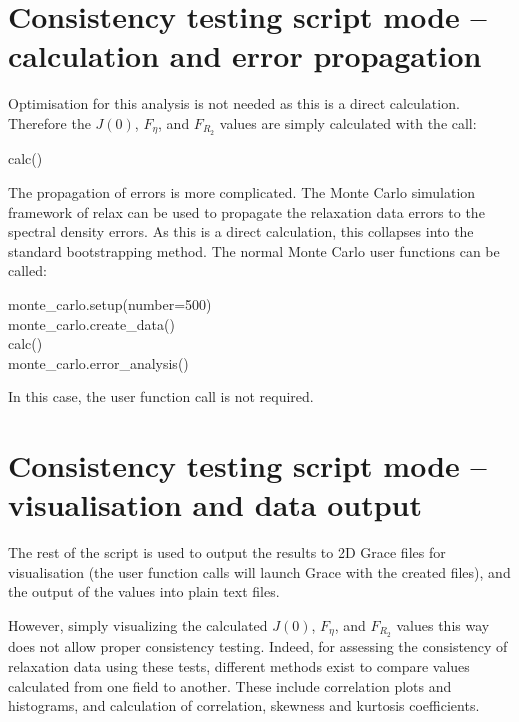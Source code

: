 
\section{Consistency testing script mode -- calculation and error propagation}

Optimisation for this analysis is not needed as this is a direct calculation.  Therefore the $J(0)$, $F_\eta$, and $F_{R_2}$ values are simply calculated with the call:

\begin{exampleenv}
calc()
\end{exampleenv}

The propagation of errors is more complicated.  The Monte Carlo simulation framework of relax can be used to propagate the relaxation data errors to the spectral density errors.  As this is a direct calculation, this collapses into the standard bootstrapping method.  The normal Monte Carlo user functions can be called:

\begin{exampleenv}
monte\_carlo.setup(number=500) \\
monte\_carlo.create\_data() \\
calc() \\
monte\_carlo.error\_analysis()
\end{exampleenv}

In this case, the  user function call is not required.



\section{Consistency testing script mode -- visualisation and data output}
\label{sec: Visualisation and data output}

The rest of the script is used to output the results to 2D Grace files for visualisation (the  user function calls will launch Grace with the created files), and the output of the values into plain text files.

However, simply visualizing the calculated $J(0)$, $F_\eta$, and $F_{R_2}$ values this way does not allow proper consistency testing. Indeed, for assessing the consistency of relaxation data using these tests, different methods exist to compare values calculated from one field to another.  These include correlation plots and histograms, and calculation of correlation, skewness and kurtosis coefficients.

